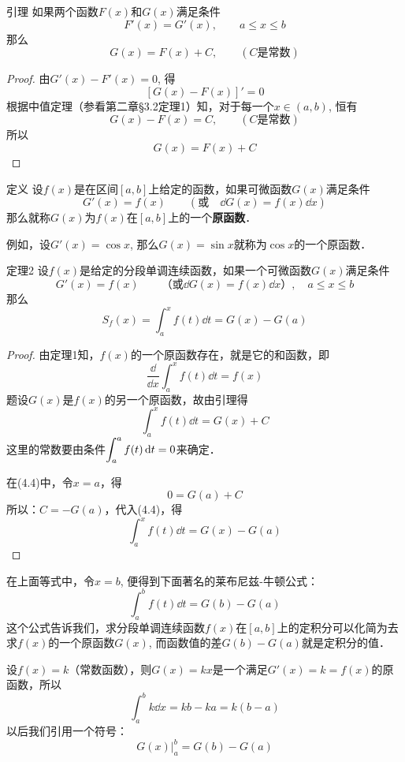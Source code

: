 \begin{blk}
    {引理} 如果两个函数$F(x)$和$G(x)$满足条件
\[F' (x) =G' (x) ,\qquad a\le x\le b\]
那么
\[G(x)=F(x)+C,\qquad (C\text{是常数})\]
\end{blk}

\begin{proof}
    由$G'(x)-F'(x)=0$, 得
\[[G (x) -F (x) ]'=0\]
根据中值定理（参看第二章\S 3.2定理1）知，对于每一个$x\in (a,b)$, 恒有
\[G(x)-F(x)=C,\qquad (C\text{是常数})\]
所以
\[G (x) =F (x) +C\]
\end{proof}

\begin{blk}
 {定义} 设$f(x)$是在区间$[a,b]$上给定的函数，如果可微函数$G(x)$满足条件
\[G'(x)=f(x)\qquad (\text{或}\quad \dd G(x)=f(x)\dd x)\]
那么就称$G(x)$为$f(x)$在$[a,b]$上的一个\textbf{原函数}．
\end{blk}

例如，设$G'(x)=\cos x$, 那么$G(x)=\sin x$就称为$\cos x$的一个原函数．

\begin{blk}
    {定理2} 设$f(x)$是给定的分段单调连续函数，如果一个可微函数$G(x)$满足条件
\begin{equation}
    G'(x)=f(x)\qquad \text{（或$\dd G(x)=f(x)\dd x$）},\quad a\le x\le b
\end{equation}    
那么
\[S_f (x)=\int^x_a  f (t) \dd t=G (x) -G (a) \]
\end{blk}

\begin{proof}
    由定理1知，$f(x)$的一个原函数存在，就是它的和函数，即
\[\frac{\dd }{\dd x}\int^x_a f(t)\dd t=f(x)\]
题设$G(x)$是$f(x)$的另一个原函数，故由引理得
\begin{equation}
    \int^x_a    f (t) \dd t=G (x) +C
\end{equation}
这里的常数要由条件$\displaystyle\int^a_a f(t)\,{\rm d} t=0$来确定．

在(4.4)中，令$x=a$，得
\[0=G(a)+C\]
所以：$C=-G(a)$，代入(4.4)，得
\[\int^x_a f(t)\dd t=G(x)-G(a)\]
\end{proof}

在上面等式中，令$x=b$, 便得到下面著名的莱布尼兹-牛顿公式：
\[\int^b_a f (t) \dd t= G (b) -G (a) \]
这个公式告诉我们，求分段单调连续函数$f(x)$在$[a,b]$上的定积分可以化简为去求$f(x)$的一个原函数$G(x)$, 而函数值的差$G(b)-G(a)$就是定积分的值．

\begin{example}
    设$f(x)=k$（常数函数），则$G(x)=kx$是一个满足$G'(x)=k=f(x)$的原函数，所以
\[\int^b_a k\dd x=kb-ka=k(b-a)\]
以后我们引用一个符号：
\[G(x)\Bigg|^b_a=G(b)-G(a)\]
\end{example}

